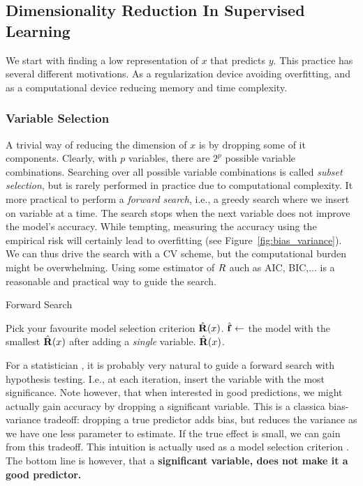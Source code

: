 \subsection{Dimensionality Reduction In Supervised Learning}
\label{sec:dim_reduce_supervised}
We start with finding a low representation of $x$ that predicts $y$.
This practice has several different motivations. As a regularization device avoiding overfitting, and  as a computational device reducing memory and time complexity. 

\subsubsection{Variable Selection}
A trivial way of reducing the dimension of $x$ is by dropping some of it components. 
Clearly, with $p$ variables, there are $2^p$ possible variable combinations. Searching over all possible variable combinations is called \emph{subset selection}, but is rarely performed in practice due to computational complexity. It more practical to perform a \emph{forward search}, i.e., a greedy search where we insert on variable at a time.
The search stops when the next variable does not improve the model's accuracy. 
While tempting, measuring the accuracy using the empirical risk will certainly lead to overfitting (see Figure~\ref{fig:bias_variance}).
We can thus drive the search with a CV scheme, but the computational burden might be overwhelming. Using some estimator of $R$ auch as AIC, BIC,... is a reasonable and practical way to guide the search.


\begin{algorithm}[H]
\caption{Forward Search}
\begin{algorithmic}
\State Pick your favourite model selection criterion $\hat{\mathbf{R}}(x)$.
    \State $\hat{\mathbf{f}} \gets$ the model with the smallest $\hat{\mathbf{R}}(x)$ after adding a \emph{single} variable.
\EndWhile
\State \Return $\hat{\mathbf{R}}(x)$.
\end{algorithmic}
\end{algorithm}



\begin{remark}
For a statistician , it is probably very natural to guide a forward search with hypothesis testing. I.e., at each iteration, insert the variable with the most significance. 
Note however, that when interested in good predictions, we might actually gain accuracy by dropping a significant variable. This is a classica bias-variance tradeoff: dropping a true predictor adds bias, but reduces the variance as we have one less parameter to estimate. If the true effect is small, we can gain from this tradeoff. 
This intuition is actually used as a model selection criterion \citep{foster_variable_2004}.
The bottom line is however, that a \textbf{significant variable, does not make it a good predictor.} 
\end{remark}

